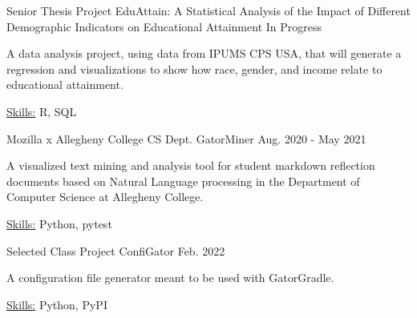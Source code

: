 

\begin{cventries}

  \cventry
    {Senior Thesis Project} %
    {EduAttain: A Statistical Analysis of the Impact of Different Demographic Indicators on Educational Attainment} %
    {} %
    {In Progress} %
    {
      \begin{cvitems} %
        \item {A data analysis project, using data from IPUMS CPS USA, that will generate a regression and visualizations to show how race, gender, and income relate to educational attainment.}
        \item{\underline{Skills:} R, SQL}
      \end{cvitems}
    }
    
  \cventry
    {Mozilla x Allegheny College CS Dept.} %
    {GatorMiner} %
    {} %
    {Aug. 2020 - May 2021} %
    {
      \begin{cvitems} %
        \item {A visualized text mining and analysis tool for student markdown reflection documents based on Natural Language processing in the Department of Computer Science at Allegheny College.}
        \item{\underline{Skills:} Python, pytest}
      \end{cvitems}
    }
    
  \cventry
    {Selected Class Project} %
    {ConfiGator} %
    {} %
    {Feb. 2022} %
    {
      \begin{cvitems} %
        \item {A configuration file generator meant to be used with GatorGradle.}
        \item{\underline{Skills:} Python, PyPI}
      \end{cvitems}
    }
    

\end{cventries}
